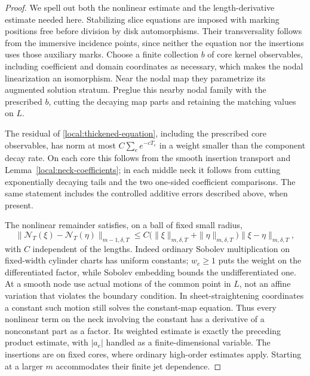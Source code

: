 \begin{proof}
We spell out both the nonlinear estimate and the length-derivative
estimate needed here.  Stabilizing slice equations are imposed with
marking positions free before division by disk automorphisms.  Their
transversality follows from the immersive incidence points, since
neither the equation nor the insertions uses those auxiliary marks.
Choose a finite collection $b$ of core kernel observables, including
coefficient and domain coordinates as necessary, which makes the
nodal linearization an isomorphism.  Near the nodal map they
parametrize its augmented solution stratum.  Preglue this nearby
nodal family with the prescribed $b$, cutting the decaying map parts
and retaining the matching values on $L$.

The residual of \eqref{local:thickened-equation}, including the
prescribed core observables, has norm at most
$C\sum_e e^{-cT_e}$ in a weight smaller than the component decay
rate.  On each core this follows from the smooth insertion transport
and Lemma~\ref{local:neck-coefficients}; in each middle neck it follows
from cutting exponentially decaying tails and the two one-sided
coefficient comparisons.  The same statement includes the controlled
additive errors described above, when present.

The nonlinear remainder satisfies, on a ball of fixed small radius,
\begin{equation}\label{local:quadratic}
 \|\mathcal N_T(\xi)-\mathcal N_T(\eta)\|_{m-1,\delta,T}
 \leq C\bigl(\|\xi\|_{m,\delta,T}+\|\eta\|_{m,\delta,T}\bigr)
                \|\xi-\eta\|_{m,\delta,T},
\end{equation}
with $C$ independent of the lengths.  Indeed ordinary Sobolev
multiplication on fixed-width cylinder charts has uniform constants;
$w_e\geq1$ puts the weight on the differentiated factor, while
Sobolev embedding bounds the undifferentiated one.  At a smooth
node use actual motions of the common point in $L$, not an affine
variation that violates the boundary condition.  In sheet-straightening
coordinates a constant such motion still solves the constant-map
equation.  Thus every nonlinear term on the neck involving the
constant has a derivative of a nonconstant part as a factor.  Its
weighted estimate is exactly the preceding product estimate, with
$|a_e|$ handled as a finite-dimensional variable.  The insertions
are on fixed cores, where ordinary high-order estimates apply.
Starting at a larger $m$ accommodates their finite jet dependence.


\end{proof}
